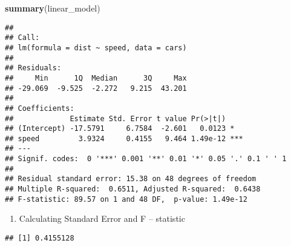 \documentclass[
]{article}
\newenvironment{Shaded}{\begin{snugshade}}{\end{snugshade}}
\newcommand{\KeywordTok}[1]{\textcolor[rgb]{0.13,0.29,0.53}{\textbf{#1}}}
\newcommand{\NormalTok}[1]{#1}
\newcommand{\OperatorTok}[1]{\textcolor[rgb]{0.81,0.36,0.00}{\textbf{#1}}}
\newcommand{\StringTok}[1]{\textcolor[rgb]{0.31,0.60,0.02}{#1}}
\providecommand{\tightlist}{%
  \setlength{\itemsep}{0pt}\setlength{\parskip}{0pt}}
\begin{document}
\begin{Shaded}
\begin{Highlighting}[]
\KeywordTok{summary}\NormalTok{(linear_model)}
\end{Highlighting}
\end{Shaded}

\begin{verbatim}
## 
## Call:
## lm(formula = dist ~ speed, data = cars)
## 
## Residuals:
##     Min      1Q  Median      3Q     Max 
## -29.069  -9.525  -2.272   9.215  43.201 
## 
## Coefficients:
##             Estimate Std. Error t value Pr(>|t|)    
## (Intercept) -17.5791     6.7584  -2.601   0.0123 *  
## speed         3.9324     0.4155   9.464 1.49e-12 ***
## ---
## Signif. codes:  0 '***' 0.001 '**' 0.01 '*' 0.05 '.' 0.1 ' ' 1
## 
## Residual standard error: 15.38 on 48 degrees of freedom
## Multiple R-squared:  0.6511, Adjusted R-squared:  0.6438 
## F-statistic: 89.57 on 1 and 48 DF,  p-value: 1.49e-12
\end{verbatim}

\begin{enumerate}
\def\labelenumi{\arabic{enumi}.}
\setcounter{enumi}{5}
\tightlist
\item
  Calculating Standard Error and F -- statistic
\end{enumerate}

\begin{Shaded}
\end{Shaded}

\begin{verbatim}
## [1] 0.4155128
\end{verbatim}

\begin{Shaded}
\end{Shaded}
\end{document}
